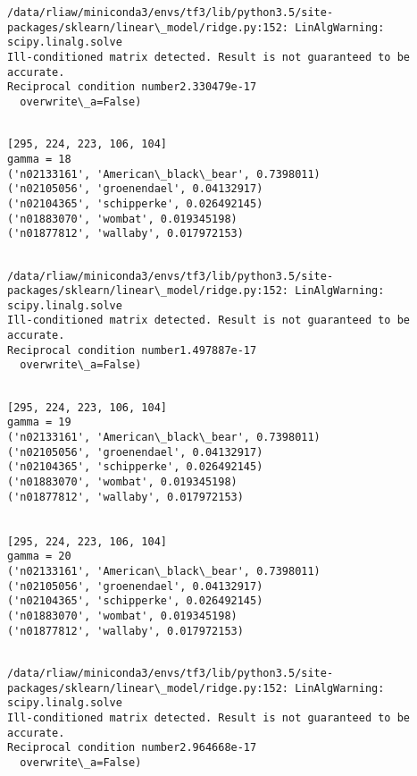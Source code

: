 \documentclass[11pt]{article}
\begin{document}
    \begin{Verbatim}[commandchars=\\\{\}]
/data/rliaw/miniconda3/envs/tf3/lib/python3.5/site-packages/sklearn/linear\_model/ridge.py:152: LinAlgWarning: scipy.linalg.solve
Ill-conditioned matrix detected. Result is not guaranteed to be accurate.
Reciprocal condition number2.330479e-17
  overwrite\_a=False)

    \end{Verbatim}

    \begin{Verbatim}[commandchars=\\\{\}]

[295, 224, 223, 106, 104]
gamma = 18
('n02133161', 'American\_black\_bear', 0.7398011)
('n02105056', 'groenendael', 0.04132917)
('n02104365', 'schipperke', 0.026492145)
('n01883070', 'wombat', 0.019345198)
('n01877812', 'wallaby', 0.017972153)


    \end{Verbatim}

    \begin{Verbatim}[commandchars=\\\{\}]
/data/rliaw/miniconda3/envs/tf3/lib/python3.5/site-packages/sklearn/linear\_model/ridge.py:152: LinAlgWarning: scipy.linalg.solve
Ill-conditioned matrix detected. Result is not guaranteed to be accurate.
Reciprocal condition number1.497887e-17
  overwrite\_a=False)

    \end{Verbatim}

    \begin{Verbatim}[commandchars=\\\{\}]

[295, 224, 223, 106, 104]
gamma = 19
('n02133161', 'American\_black\_bear', 0.7398011)
('n02105056', 'groenendael', 0.04132917)
('n02104365', 'schipperke', 0.026492145)
('n01883070', 'wombat', 0.019345198)
('n01877812', 'wallaby', 0.017972153)


[295, 224, 223, 106, 104]
gamma = 20
('n02133161', 'American\_black\_bear', 0.7398011)
('n02105056', 'groenendael', 0.04132917)
('n02104365', 'schipperke', 0.026492145)
('n01883070', 'wombat', 0.019345198)
('n01877812', 'wallaby', 0.017972153)


    \end{Verbatim}

    \begin{Verbatim}[commandchars=\\\{\}]
/data/rliaw/miniconda3/envs/tf3/lib/python3.5/site-packages/sklearn/linear\_model/ridge.py:152: LinAlgWarning: scipy.linalg.solve
Ill-conditioned matrix detected. Result is not guaranteed to be accurate.
Reciprocal condition number2.964668e-17
  overwrite\_a=False)

    \end{Verbatim}
\end{document}
